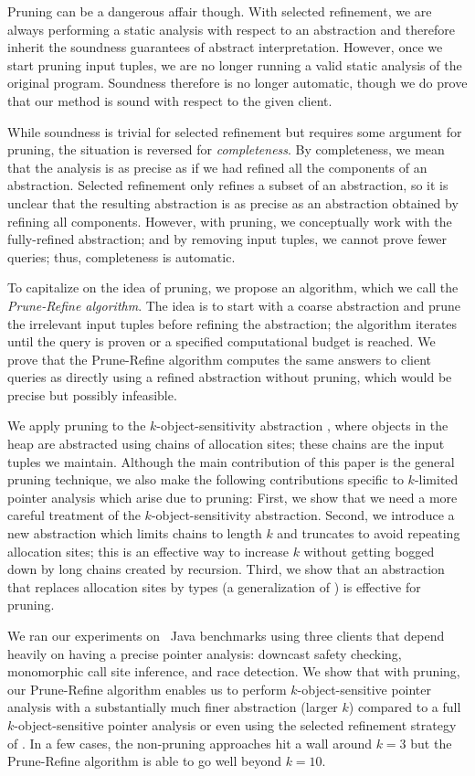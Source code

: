 Pruning can be a dangerous affair though.  With selected refinement,
we are always performing a static analysis with respect to an abstraction
and therefore inherit the soundness guarantees of abstract interpretation.
However, once we start pruning input tuples, we are no longer running a valid
static analysis of the original program.  Soundness therefore is no longer automatic,
though we do prove that our method is sound with respect to the given client.

While soundness is trivial for selected refinement but requires some
argument for pruning, the situation is reversed for {\em completeness}.  By
completeness, we mean that the analysis is as precise as
if we had refined all the components of an abstraction.  Selected
refinement only refines a subset of an abstraction, so it is unclear
that the resulting abstraction is as precise as an abstraction obtained by
refining all components.  However, with pruning, we conceptually work with the
fully-refined abstraction; and by removing input tuples, we cannot prove fewer
queries; thus, completeness is automatic.

To capitalize on the idea of pruning, we propose an algorithm, which we
call the {\em Prune-Refine algorithm}.  The idea is to start with a coarse abstraction
and prune the irrelevant input tuples before refining the abstraction; the
algorithm iterates until the query is proven or a specified computational budget
is reached.  We prove that the Prune-Refine algorithm computes the same answers to client queries
as directly using a refined abstraction without pruning, which would be precise
but possibly infeasible.

We apply pruning to the $k$-object-sensitivity abstraction
\cite{kobj}, where objects in the heap are abstracted using chains of
allocation sites; these chains are the input tuples we maintain.
Although the main contribution of this paper is the general
pruning technique, we also make the following contributions specific to
$k$-limited pointer analysis which arise due to pruning: First, we show
that we need a more careful treatment of the $k$-object-sensitivity abstraction.
Second, we introduce a new abstraction which limits
chains to length $k$ and truncates to avoid repeating
allocation sites; this is an effective way to increase $k$ without getting bogged down by long chains created by recursion.
Third, we show that an abstraction that
replaces allocation sites by types (a generalization of
\cite{smaragdakis11context}) is effective for pruning.

We ran our experiments on \numBenchmarks\ Java benchmarks using three clients that
depend heavily on having a precise pointer analysis: downcast safety
checking, monomorphic call site inference, and race detection.
We show that with pruning, our Prune-Refine algorithm enables us to perform $k$-object-sensitive
pointer analysis with a substantially much finer abstraction (larger $k$)
compared to a full $k$-object-sensitive pointer analysis or even using the selected
refinement strategy of \cite{liang11minimal}.
In a few cases, the non-pruning approaches hit a wall around $k=3$ but the Prune-Refine
algorithm is able to go well beyond $k=10$.
